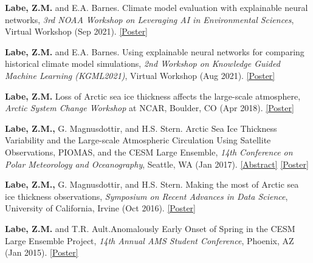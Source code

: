 \documentclass[margin,line,palatino,courier,10pt]{res}
\begin{document}
\begin{resume}
\begin{etaremune}[leftmargin=0in,topsep=0in,parsep=0in]
\item \textbf{Labe, Z.M.} and E.A. Barnes. Climate model evaluation with explainable neural networks, \textit{3rd NOAA Workshop on Leveraging AI in Environmental Sciences}, Virtual Workshop (Sep 2021). \href{https://zacklabe.files.wordpress.com/2022/08/b875c-labebarnes_noaa-aies_2021_poster.pdf}{[Poster]}
\item \textbf{Labe, Z.M.} and E.A. Barnes. Using explainable neural networks for comparing historical climate model simulations, \textit{2nd Workshop on Knowledge Guided Machine Learning (KGML2021)}, Virtual Workshop (Aug 2021). \href{https://zacklabe.files.wordpress.com/2022/08/aa648-labebarnes_kgml2021_poster_v2_final.pdf}{[Poster]}
\item \textbf{Labe, Z.M.} Loss of Arctic sea ice thickness affects the large-scale atmosphere, \textit{Arctic System Change Workshop} at NCAR, Boulder, CO (Apr 2018). \href{https://zacklabe.files.wordpress.com/2022/08/ff668-zlabe_042018_bigideaposter.pdf}{[Poster]}
\item \textbf{Labe, Z.M.,} G. Magnusdottir, and H.S. Stern. Arctic Sea Ice Thickness Variability and the Large-scale Atmospheric Circulation Using Satellite Observations, PIOMAS, and the CESM Large Ensemble, \textit{14th Conference on Polar Meteorology and Oceanography}, Seattle, WA (Jan 2017). \href{https://ams.confex.com/ams/97Annual/webprogram/Paper313445.html}{[Abstract]} \href{https://zacklabe.files.wordpress.com/2022/08/c332e-zlabemagnusdottirstern_amsposter_2017.pdf}{[Poster]}
\item \textbf{Labe, Z.M.,} G. Magnusdottir, and H.S. Stern. Making the most of Arctic sea ice thickness observations, \textit{Symposium on Recent Advances in Data Science}, University of California, Irvine (Oct 2016). \href{https://zacklabe.files.wordpress.com/2022/08/c4b1e-zlabemagnusdottirstern_dsiposter_oct16.pdf}{[Poster]}
\item \textbf{Labe, Z.M.} and T.R. Ault.\@ Anomalously Early Onset of Spring in the CESM Large Ensemble Project, \textit{14th Annual AMS Student Conference}, Phoenix, AZ (Jan 2015). \href{https://ams.confex.com/ams/95Annual/webprogram/Paper271063.html}{[Poster]}

\end{etaremune}


\end{resume}
\end{document}
